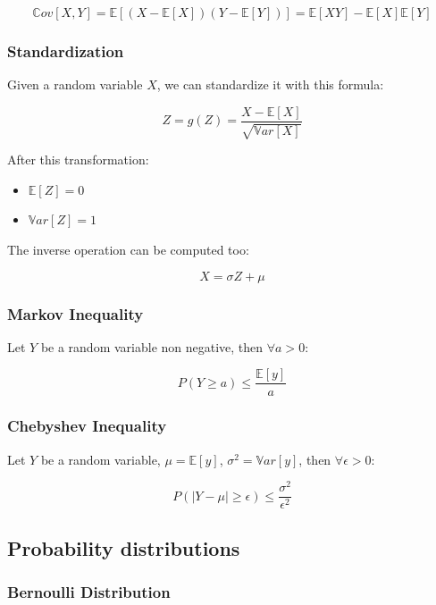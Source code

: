 \documentclass{article}
\begin{document}
\[\mathbb{C}ov[X, Y]=\mathbb{E}[(X-\mathbb{E}[X])(Y-\mathbb{E}[Y])]=\mathbb{E}[XY]-\mathbb{E}[X]\mathbb{E}[Y]\]

\subsubsection{Standardization}\label{standardization}

Given a random variable \(X\), we can standardize it with this formula:

\[Z=g(Z)=\frac{X-\mathbb{E}[X]}{\sqrt{\mathbb{V}ar[X]}}\]

After this transformation:

\begin{itemize}
\tightlist
\item
  \(\mathbb{E}[Z]=0\)
\item
  \(\mathbb{V}ar[Z]=1\)
\end{itemize}

The inverse operation can be computed too:

\[X=\sigma Z + \mu\]

\subsubsection{Markov Inequality}\label{markov-inequality}

Let \(Y\) be a random variable non negative, then \(\forall a>0\):

\[P(Y\ge a)\le \frac{\mathbb{E}[y]}{a}\]

\subsubsection{Chebyshev Inequality}\label{chebyshev-inequality}

Let \(Y\) be a random variable, \(\mu = \mathbb{E}[y]\),
\(\sigma^2=\mathbb{V}ar[y]\), then \(\forall \epsilon > 0\):

\[P(|Y-\mu| \ge \epsilon)\le \frac{\sigma^2}{\epsilon^2}\]

\subsection{Probability distributions}\label{probability-distributions}

\subsubsection{Bernoulli Distribution}\label{bernoulli-distribution}
\end{document}
